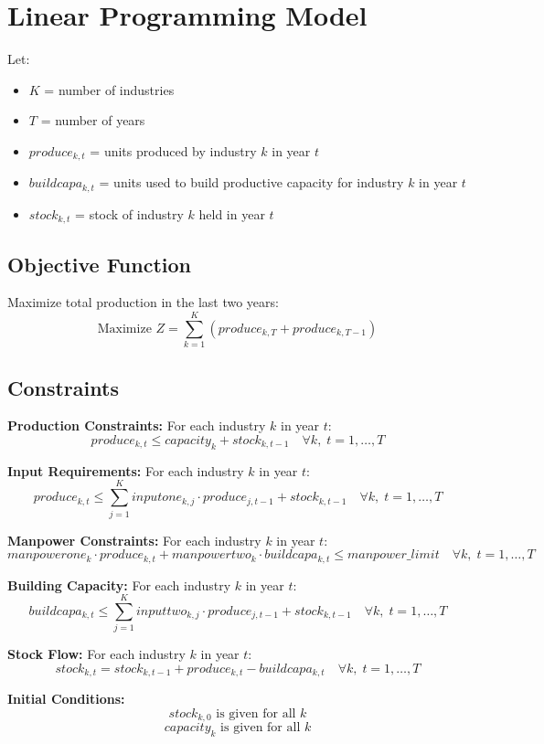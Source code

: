 \documentclass{article}
\begin{document}
\section*{Linear Programming Model}

Let:
\begin{itemize}
    \item \( K \) = number of industries
    \item \( T \) = number of years
    \item \( produce_{k,t} \) = units produced by industry \( k \) in year \( t \)
    \item \( buildcapa_{k,t} \) = units used to build productive capacity for industry \( k \) in year \( t \)
    \item \( stock_{k,t} \) = stock of industry \( k \) held in year \( t \)
\end{itemize}

\subsection*{Objective Function}
Maximize total production in the last two years:
\[
\text{Maximize } Z = \sum_{k=1}^{K} \left( produce_{k,T} + produce_{k,T-1} \right)
\]

\subsection*{Constraints}

\textbf{Production Constraints:}
For each industry \( k \) in year \( t \):
\[
produce_{k,t} \leq capacity_{k} + stock_{k,t-1} \quad \forall k, \; t = 1, \ldots, T
\]

\textbf{Input Requirements:}
For each industry \( k \) in year \( t \):
\[
produce_{k,t} \leq \sum_{j=1}^{K} inputone_{k,j} \cdot produce_{j,t-1} + stock_{k,t-1} \quad \forall k, \; t = 1, \ldots, T
\]

\textbf{Manpower Constraints:}
For each industry \( k \) in year \( t \):
\[
manpowerone_{k} \cdot produce_{k,t} + manpowertwo_{k} \cdot buildcapa_{k,t} \leq manpower\_limit \quad \forall k, \; t = 1, \ldots, T
\]

\textbf{Building Capacity:}
For each industry \( k \) in year \( t \):
\[
buildcapa_{k,t} \leq \sum_{j=1}^{K} inputtwo_{k,j} \cdot produce_{j,t-1} + stock_{k,t-1} \quad \forall k, \; t = 1, \ldots, T
\]

\textbf{Stock Flow:}
For each industry \( k \) in year \( t \):
\[
stock_{k,t} = stock_{k,t-1} + produce_{k,t} - buildcapa_{k,t} \quad \forall k, \; t = 1, \ldots, T
\]

\textbf{Initial Conditions:}
\[
stock_{k,0} \text{ is given for all } k
\]
\[
capacity_{k} \text{ is given for all } k
\]
\end{document}

